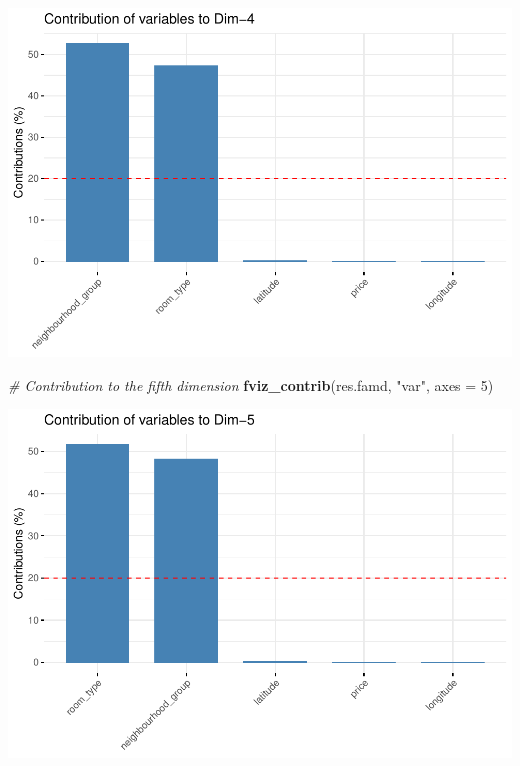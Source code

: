 \documentclass[
]{article}
\newenvironment{Shaded}{\begin{snugshade}}{\end{snugshade}}
\newcommand{\CommentTok}[1]{\textcolor[rgb]{0.56,0.35,0.01}{\textit{#1}}}
\newcommand{\DataTypeTok}[1]{\textcolor[rgb]{0.13,0.29,0.53}{#1}}
\newcommand{\DecValTok}[1]{\textcolor[rgb]{0.00,0.00,0.81}{#1}}
\newcommand{\KeywordTok}[1]{\textcolor[rgb]{0.13,0.29,0.53}{\textbf{#1}}}
\newcommand{\NormalTok}[1]{#1}
\newcommand{\StringTok}[1]{\textcolor[rgb]{0.31,0.60,0.02}{#1}}
\begin{document}
\includegraphics{project-code_files/figure-latex/unnamed-chunk-39-5.pdf}

\begin{Shaded}
\begin{Highlighting}[]
\CommentTok{# Contribution to the fifth dimension}
\KeywordTok{fviz_contrib}\NormalTok{(res.famd, }\StringTok{"var"}\NormalTok{, }\DataTypeTok{axes =} \DecValTok{5}\NormalTok{)}
\end{Highlighting}
\end{Shaded}

\includegraphics{project-code_files/figure-latex/unnamed-chunk-39-6.pdf}
\end{document}
